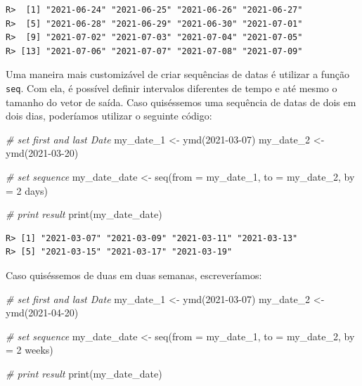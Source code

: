\documentclass[
  11pt,
]{book}
\newenvironment{Shaded}{\begin{snugshade}}{\end{snugshade}}
\newcommand{\AttributeTok}[1]{\textcolor[rgb]{0.61,0.61,0.61}{#1}}
\newcommand{\CommentTok}[1]{\textcolor[rgb]{0.37,0.37,0.37}{\textit{#1}}}
\newcommand{\FunctionTok}[1]{\textcolor[rgb]{0,0,0}{#1}}
\newcommand{\NormalTok}[1]{#1}
\newcommand{\OtherTok}[1]{\textcolor[rgb]{0.37,0.37,0.37}{#1}}
\newcommand{\StringTok}[1]{\textcolor[rgb]{0.5,0.5,0.5}{#1}}
\begin{document}
\begin{verbatim}
R>  [1] "2021-06-24" "2021-06-25" "2021-06-26" "2021-06-27"
R>  [5] "2021-06-28" "2021-06-29" "2021-06-30" "2021-07-01"
R>  [9] "2021-07-02" "2021-07-03" "2021-07-04" "2021-07-05"
R> [13] "2021-07-06" "2021-07-07" "2021-07-08" "2021-07-09"
\end{verbatim}

Uma maneira mais customizável de criar sequências de datas é utilizar a função \texttt{seq}. Com ela, é possível definir intervalos diferentes de tempo e até mesmo o tamanho do vetor de saída. Caso quiséssemos uma sequência de datas de dois em dois dias, poderíamos utilizar o seguinte código: 

\begin{Shaded}
\begin{Highlighting}[]
\CommentTok{\# set first and last Date}
\NormalTok{my\_date\_1 }\OtherTok{\textless{}{-}} \FunctionTok{ymd}\NormalTok{(}\StringTok{\textquotesingle{}2021{-}03{-}07\textquotesingle{}}\NormalTok{)}
\NormalTok{my\_date\_2 }\OtherTok{\textless{}{-}} \FunctionTok{ymd}\NormalTok{(}\StringTok{\textquotesingle{}2021{-}03{-}20\textquotesingle{}}\NormalTok{)}

\CommentTok{\# set sequence}
\NormalTok{my\_date\_date }\OtherTok{\textless{}{-}} \FunctionTok{seq}\NormalTok{(}\AttributeTok{from =}\NormalTok{ my\_date\_1,}
                    \AttributeTok{to =}\NormalTok{ my\_date\_2,}
                    \AttributeTok{by =} \StringTok{\textquotesingle{}2 days\textquotesingle{}}\NormalTok{)}

\CommentTok{\# print result}
\FunctionTok{print}\NormalTok{(my\_date\_date)}
\end{Highlighting}
\end{Shaded}

\begin{verbatim}
R> [1] "2021-03-07" "2021-03-09" "2021-03-11" "2021-03-13"
R> [5] "2021-03-15" "2021-03-17" "2021-03-19"
\end{verbatim}

Caso quiséssemos de duas em duas semanas, escreveríamos:

\begin{Shaded}
\begin{Highlighting}[]
\CommentTok{\# set first and last Date}
\NormalTok{my\_date\_1 }\OtherTok{\textless{}{-}} \FunctionTok{ymd}\NormalTok{(}\StringTok{\textquotesingle{}2021{-}03{-}07\textquotesingle{}}\NormalTok{)}
\NormalTok{my\_date\_2 }\OtherTok{\textless{}{-}} \FunctionTok{ymd}\NormalTok{(}\StringTok{\textquotesingle{}2021{-}04{-}20\textquotesingle{}}\NormalTok{)}

\CommentTok{\# set sequence}
\NormalTok{my\_date\_date }\OtherTok{\textless{}{-}} \FunctionTok{seq}\NormalTok{(}\AttributeTok{from =}\NormalTok{ my\_date\_1,}
                    \AttributeTok{to =}\NormalTok{ my\_date\_2,}
                    \AttributeTok{by =} \StringTok{\textquotesingle{}2 weeks\textquotesingle{}}\NormalTok{)}

\CommentTok{\# print result}
\FunctionTok{print}\NormalTok{(my\_date\_date)}
\end{Highlighting}
\end{Shaded}
\end{document}
